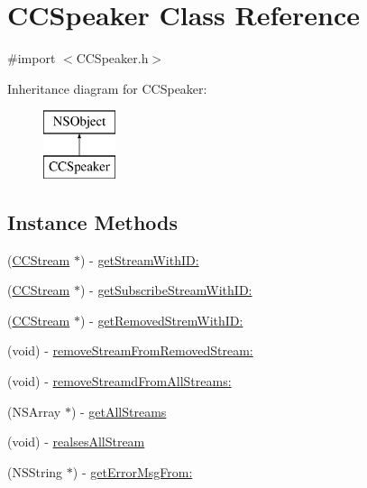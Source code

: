 \hypertarget{interface_c_c_speaker}{}\section{C\+C\+Speaker Class Reference}
\label{interface_c_c_speaker}


{\ttfamily \#import $<$C\+C\+Speaker.\+h$>$}

Inheritance diagram for C\+C\+Speaker\+:\begin{figure}[H]
\begin{center}
\leavevmode
\includegraphics[height=2.000000cm]{interface_c_c_speaker}
\end{center}
\end{figure}
\subsection*{Instance Methods}
\begin{DoxyCompactItemize}
\item 
(\hyperlink{interface_c_c_stream}{C\+C\+Stream} $\ast$) -\/ \hyperlink{interface_c_c_speaker_afaaf11a11080fff3ce0157ba4ab2d904}{get\+Stream\+With\+I\+D\+:}
\item 
(\hyperlink{interface_c_c_stream}{C\+C\+Stream} $\ast$) -\/ \hyperlink{interface_c_c_speaker_a612d3ca702b8e8f8dcd94c285cdcd807}{get\+Subscribe\+Stream\+With\+I\+D\+:}
\item 
(\hyperlink{interface_c_c_stream}{C\+C\+Stream} $\ast$) -\/ \hyperlink{interface_c_c_speaker_abae7fec416e47da8468342b66a587da9}{get\+Removed\+Strem\+With\+I\+D\+:}
\item 
(void) -\/ \hyperlink{interface_c_c_speaker_a6d2ff7ef65cf4bb27aaea04abdcea892}{remove\+Stream\+From\+Removed\+Stream\+:}
\item 
(void) -\/ \hyperlink{interface_c_c_speaker_a0ca8c1d569368f57990783e0fc8f4c4f}{remove\+Streamd\+From\+All\+Streams\+:}
\item 
(N\+S\+Array $\ast$) -\/ \hyperlink{interface_c_c_speaker_a1cd2a8633022985f13382a6895f96f21}{get\+All\+Streams}
\item 
(void) -\/ \hyperlink{interface_c_c_speaker_a6753ddeafdb6b5454b96f19bc820dc4b}{realses\+All\+Stream}
\item 
(N\+S\+String $\ast$) -\/ \hyperlink{interface_c_c_speaker_a89a3d868010262874a4bb26e349655fb}{get\+Error\+Msg\+From\+:}
\end{DoxyCompactItemize}
